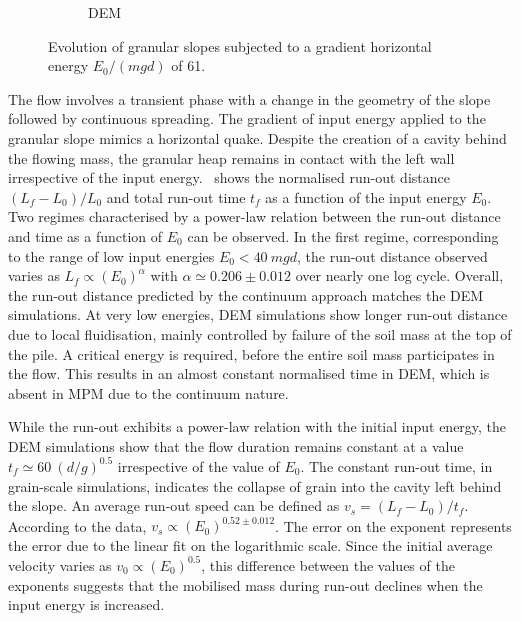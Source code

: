 \documentclass[3p,times,procedia,number]{elsarticle}
\begin{document}
\begin{figure}[tbph]
\begin{subfigure}[b]{0.42\textwidth}
    \caption{DEM}
    \label{fig:dem_gradvelocity_200j}
  \end{subfigure}
  \caption{Evolution of granular slopes subjected to a gradient
    horizontal energy $E_0/(mgd)$ of 61.}
  \label{fig:gradvelocity_200j}
\end{figure}


The flow involves a transient phase with a change in the geometry of the slope 
followed by continuous spreading. The gradient of input energy applied to the 
granular slope mimics a horizontal quake. Despite the creation of a cavity
behind the flowing mass, the granular heap remains in contact with the left
wall irrespective of the input energy.~ shows the
normalised run-out distance $(L_f - L_0)/L_0$ and total run-out time $t_f$ as a
function of the input energy $E_0$. Two regimes characterised by a power-law
relation between the run-out distance and time as a function of $E_0$ can be
observed. In the first regime, corresponding to the range of low input energies
$E_0 < 40 \ mgd$, the run-out distance observed varies as $L_f \propto
(E_0)^\alpha$ with $\alpha \simeq 0.206 \pm 0.012$ over nearly one log cycle.
Overall, the run-out distance predicted by the continuum approach matches the
DEM simulations. At very low energies, DEM simulations show longer run-out
distance due to local fluidisation, mainly controlled by failure of the soil
mass at the top of the pile. A critical energy is required, before the entire
soil mass participates in the flow. This results in an almost constant
normalised time in DEM, which is absent in MPM due to the continuum nature.


While the run-out exhibits a power-law relation with the initial input energy, 
the DEM simulations show that the flow duration remains constant at a value  
$t_f \simeq 60 \  (d/g)^{0.5}$ irrespective of the value of $E_0$. The constant 
run-out time, in grain-scale simulations, indicates the collapse of grain into 
the cavity left behind the slope. An average run-out speed can be defined as 
$v_s = (L_f - L_0) / t_f$. According to the data, $v_s \propto 
(E_0)^{0.52\pm 0.012}$. The error on the exponent represents the error due to
the linear fit on the logarithmic scale. Since the initial average velocity
varies as $v_0 \propto (E_0)^{0.5}$, this difference between the values of the
exponents suggests that the mobilised mass during run-out declines when the
input energy is increased.
\end{document}
